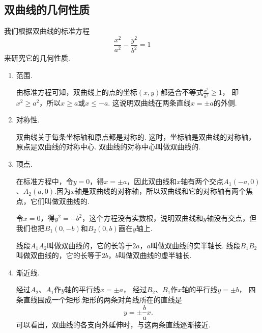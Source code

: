 \subsection{双曲线的几何性质}
我们根据双曲线的标准方程\begin{equation*}
	\frac{x^2}{a^2} - \frac{y^2}{b^2} = 1
\end{equation*}
来研究它的几何性质.
\begin{enumerate}
	\item 范围.

	由标准方程可知，双曲线上的点的坐标\((x,y)\)都适合不等式\(\frac{x^2}{a^2}\geq1\)，
	即\(x^2 \geq a^2\)，所以\(x \geq a\)或\(x \leq -a\).
	这说明双曲线在两条直线\(x = \pm a\)的外侧.

	\item 对称性.

	双曲线关于每条坐标轴和原点都是对称的.
	这时，坐标轴是双曲线的对称轴，原点是双曲线的对称中心.
	双曲线的对称中心叫做双曲线的.

	\item 顶点.

	在标准方程中，令\(y=0\)，得\(x = \pm a\)，因此双曲线和\(x\)轴有两个交点\(A_1(-a,0)\)、\(A_2(a,0)\).因为\(x\)轴是双曲线的对称轴，所以双曲线和它的对称轴有两个焦点，它们叫做双曲线的.

	令\(x=0\)，得\(y^2=-b^2\)，这个方程没有实数根，说明双曲线和\(y\)轴没有交点，但我们也把\(B_1(0,-b)\)和\(B_2(0,b)\)画在\(y\)轴上.

	线段\(A_1 A_2\)叫做双曲线的，它的长等于\(2a\)，\(a\)叫做双曲线的实半轴长.
	线段\(B_1 B_2\)叫做双曲线的，它的长等于\(2b\)，\(b\)叫做双曲线的虚半轴长.

	\item 渐近线.

	经过\(A_2\)、\(A_1\)作\(y\)轴的平行线\(x = \pm a\)，
	经过\(B_2\)、\(B_1\)作\(x\)轴的平行线\(y = \pm b\)，
	四条直线围成一个矩形.矩形的两条对角线所在的直线是\begin{equation*}
		y = \pm\frac{b}{a}x.
	\end{equation*}
	可以看出，双曲线的各支向外延伸时，与这两条直线逐渐接近.


\end{enumerate}
